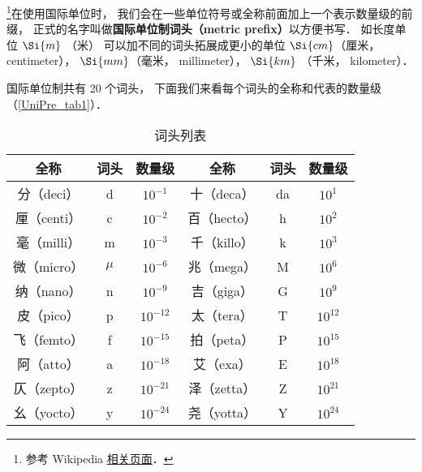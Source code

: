 

\footnote{参考 Wikipedia \href{https://en.wikipedia.org/wiki/Metric_prefix}{相关页面}．}在使用国际单位时， 我们会在一些单位符号或全称前面加上一个表示数量级的前缀， 正式的名字叫做\textbf{国际单位制词头（metric prefix）}以方便书写． 如长度单位 $\Si{m}$ （米） 可以加不同的词头拓展成更小的单位 $\Si{cm}$（厘米， centimeter）， $\Si{mm}$（毫米， millimeter）， $\Si{km}$ （千米， kilometer）．

国际单位制共有 20 个词头， 下面我们来看每个词头的全称和代表的数量级（\autoref{UniPre_tab1}）．

\begin{table}[ht]
\centering
\caption{词头列表}\label{UniPre_tab1}
\begin{tabular}{|c|c|c|c|c|c|}
\hline
全称 & 词头 & 数量级 & 全称 & 词头 & 数量级 \\
\hline
分（deci） & d & $10^{-1}$ & 十（deca） & da & $10^1$ \\
\hline
厘（centi） & c & $10^{-2}$ & 百（hecto） & h & $10^2$ \\
\hline
毫（milli） & m & $10^{-3}$ & 千（killo） & k & $10^3$ \\
\hline
微（micro） & $\mu$ & $10^{-6}$ & 兆（mega） & M & $10^6$ \\
\hline
纳（nano） & n & $10^{-9}$ & 吉（giga） & G & $10^9$ \\
\hline
皮（pico） & p & $10^{-12}$ & 太（tera） & T & $10^{12}$ \\
\hline
飞（femto） & f & $10^{-15}$ & 拍（peta） & P & $10^{15}$ \\
\hline
阿（atto） & a & $10^{-18}$ & 艾（exa） & E & $10^{18}$ \\
\hline
仄（zepto） & z & $10^{-21}$ & 泽（zetta） & Z & $10^{21}$ \\
\hline
幺（yocto） & y & $10^{-24}$ & 尧（yotta） & Y & $10^{24}$ \\
\hline
\end{tabular}
\end{table}
